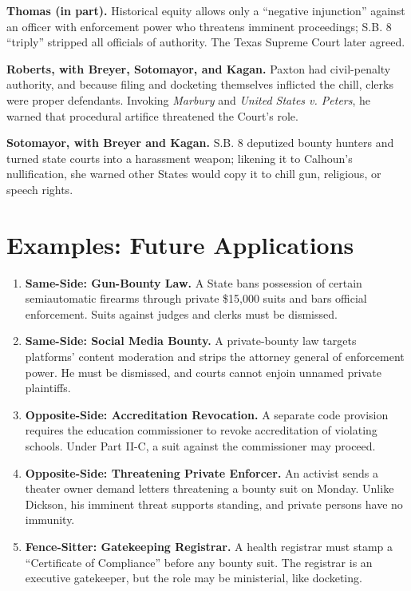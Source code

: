 \documentclass[12pt]{article}
\begin{document}
\textbf{Thomas (in part).} Historical equity allows only a ``negative injunction'' against an officer with enforcement power who threatens imminent proceedings; S.B. 8 ``triply'' stripped all officials of authority. The Texas Supreme Court later agreed.

\textbf{Roberts, with Breyer, Sotomayor, and Kagan.} Paxton had civil-penalty authority, and because filing and docketing themselves inflicted the chill, clerks were proper defendants. Invoking \textit{Marbury} and \textit{United States v. Peters}, he warned that procedural artifice threatened the Court's role.

\textbf{Sotomayor, with Breyer and Kagan.} S.B. 8 deputized bounty hunters and turned state courts into a harassment weapon; likening it to Calhoun's nullification, she warned other States would copy it to chill gun, religious, or speech rights.

\section{Examples: Future Applications}

\begin{enumerate}
\item \textbf{Same-Side: Gun-Bounty Law.} A State bans possession of certain semiautomatic firearms through private \$15,000 suits and bars official enforcement. Suits against judges and clerks must be dismissed.
\item \textbf{Same-Side: Social Media Bounty.} A private-bounty law targets platforms' content moderation and strips the attorney general of enforcement power. He must be dismissed, and courts cannot enjoin unnamed private plaintiffs.
\item \textbf{Opposite-Side: Accreditation Revocation.} A separate code provision requires the education commissioner to revoke accreditation of violating schools. Under Part II-C, a suit against the commissioner may proceed.
\item \textbf{Opposite-Side: Threatening Private Enforcer.} An activist sends a theater owner demand letters threatening a bounty suit on Monday. Unlike Dickson, his imminent threat supports standing, and private persons have no immunity.
\item \textbf{Fence-Sitter: Gatekeeping Registrar.} A health registrar must stamp a ``Certificate of Compliance'' before any bounty suit. The registrar is an executive gatekeeper, but the role may be ministerial, like docketing.
\end{enumerate}
\end{document}
